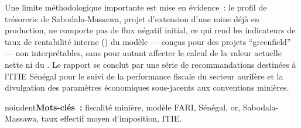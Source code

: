 Une limite méthodologique importante est mise en évidence~: le profil de trésorerie de Sabodala-Massawa, projet d'extension d'une mine déjà en production, ne comporte pas de flux négatif initial, ce qui rend les indicateurs de taux de rentabilité interne (\TRI) du modèle --- conçus pour des projets ``greenfield'' --- non interprétables, sans pour autant affecter le calcul de la valeur actuelle nette ni du \TEMI. Le rapport se conclut par une série de recommandations destinées à l'ITIE Sénégal pour le suivi de la performance fiscale du secteur aurifère et la divulgation des paramètres économiques sous-jacents aux conventions minières.

\bigskip
noindent\textbf{Mots-clés~:} fiscalité minière, modèle FARI, Sénégal, or, Sabodala-Massawa, taux effectif moyen d'imposition, ITIE.
